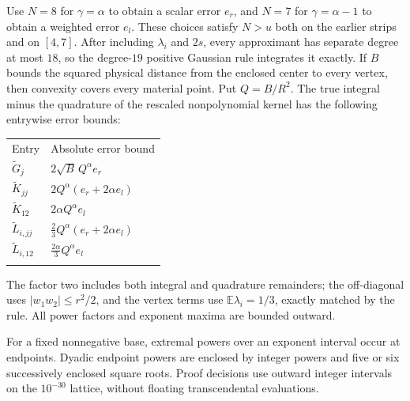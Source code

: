 \documentclass[11pt]{article}
\theoremstyle{definition}
\newcommand{\E}{\mathbb E}
\newcommand{\toprule}{\noalign{\hrule height 0.8pt\vskip4pt}}
\newcommand{\midrule}{\noalign{\vskip3pt\hrule height 0.4pt\vskip3pt}}
\newcommand{\bottomrule}{\noalign{\vskip3pt\hrule height 0.8pt}}
\begin{document}
Use $N=8$ for $\gamma=\alpha$ to obtain a scalar error $e_r$, and $N=7$
for $\gamma=\alpha-1$ to obtain a weighted error $e_l$.
These choices satisfy $N>u$ both on the earlier strips and on $[4,7]$.
After including $\lambda_i$ and $2s$, every approximant has separate degree
at most $18$, so the degree-$19$ positive Gaussian rule integrates it exactly.
If $B$ bounds the squared physical distance from the enclosed center to
every vertex, then convexity covers every material point. Put $Q=B/R^2$.
The true integral minus the quadrature of the rescaled nonpolynomial kernel
has the following entrywise error bounds:
\begin{center}
\begin{tabular}{@{}ll@{}}
\toprule
Entry & Absolute error bound\\
\midrule
$\widetilde G_j$ & $2\sqrt B\,Q^\alpha e_r$\\
$\widetilde K_{jj}$ & $2Q^\alpha(e_r+2\alpha e_l)$\\
$\widetilde K_{12}$ & $2\alpha Q^\alpha e_l$\\
$\widetilde L_{i,jj}$ & $\frac23Q^\alpha(e_r+2\alpha e_l)$\\
$\widetilde L_{i,12}$ & $\frac{2\alpha}{3}Q^\alpha e_l$\\
\bottomrule
\end{tabular}
\end{center}
The factor two includes both integral and quadrature remainders; the
off-diagonal uses $|w_1w_2|\le r^2/2$, and the vertex terms use
$\E\lambda_i=1/3$, exactly matched by the rule. All power factors and
exponent maxima are bounded outward.

For a fixed nonnegative base, extremal powers over an exponent interval
occur at endpoints. Dyadic endpoint powers are enclosed by integer powers
and five or six successively enclosed square roots. Proof decisions use
outward integer intervals on the $10^{-30}$ lattice, without floating
transcendental evaluations.
\end{document}
